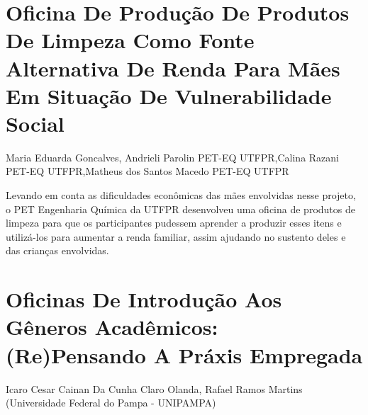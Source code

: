


\section*{Oficina De Produção De Produtos De Limpeza Como Fonte Alternativa De Renda Para Mães Em Situação De Vulnerabilidade Social}

Maria Eduarda Goncalves, Andrieli Parolin PET-EQ UTFPR,Calina Razani PET-EQ UTFPR,Matheus dos Santos Macedo PET-EQ UTFPR

Levando em conta as dificuldades econômicas das mães envolvidas nesse projeto, o PET Engenharia Química da UTFPR desenvolveu uma oficina de produtos de limpeza para que os participantes pudessem aprender a produzir esses itens e utilizá-los para aumentar a renda familiar, assim ajudando no sustento deles e das crianças envolvidas.




\section*{Oficinas De Introdução Aos Gêneros Acadêmicos: (Re)Pensando A Práxis Empregada }

Icaro Cesar Cainan Da Cunha Claro Olanda, Rafael Ramos Martins (Universidade Federal do Pampa - UNIPAMPA)

